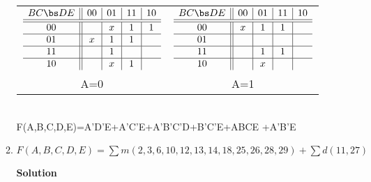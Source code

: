 \begin{enumerate}
\begin{enumerate}
\begin{onlysolution}
{\begin{tabular}{cc}
$\begin{array} {c||c|c|c|c}
   B C \bs D E   & 00 & 01 & 11 & 10 \\ \hline \hline
       00        &    & x  & 1  & 1  \\ \hline
       01        & x  & 1  & 1  &    \\ \hline
       11        &    & 1  &    &    \\ \hline
       10        &    & x  & 1  &    \\
\end{array}$ &
$\begin{array} {c||c|c|c|c}
   B C \bs D E   & 00 & 01 & 11 & 10 \\ \hline \hline
       00        & x  & 1  & 1  &    \\ \hline
       01        &    &    &    &    \\ \hline
       11        &    & 1  & 1  &    \\ \hline
       10        &    & x  &    &    \\
\end{array}$ \\
A=0 & A=1 \\
\end{tabular} \\
F(A,B,C,D,E)=A'D'E+A'C'E+A'B'C'D+B'C'E+ABCE +A'B'E
} \end{onlysolution} 

\item $F(A,B,C,D,E)=\sum m(2,3,6,10,12,13,14,18,25,26,28,29)+\sum d(11,27)$

\begin{onlysolution}  \textbf{Solution} \itshape{

}
\end{onlysolution}
\end{enumerate}
\end{enumerate}
